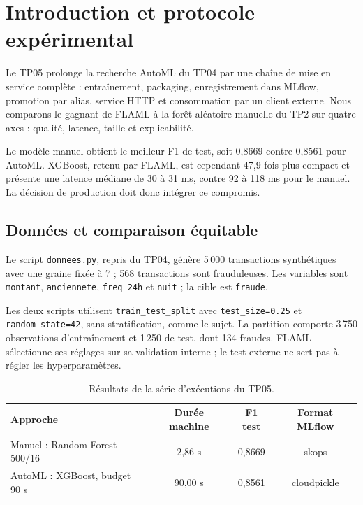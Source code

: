 \documentclass[11pt,a4paper]{article}
\begin{document}
\hypersetup{pageanchor=true}
\newpage
\tableofcontents
\newpage
\section{Introduction et protocole expérimental}
Le TP05 prolonge la recherche AutoML du TP04 par une chaîne de mise en service complète : entraînement, packaging, enregistrement dans MLflow, promotion par alias, service HTTP et consommation par un client externe. Nous comparons le gagnant de FLAML à la forêt aléatoire manuelle du TP2 sur quatre axes : qualité, latence, taille et explicabilité.

Le modèle manuel obtient le meilleur F1 de test, soit 0,8669 contre 0,8561 pour AutoML. XGBoost, retenu par FLAML, est cependant 47,9 fois plus compact et présente une latence médiane de 30 à 31 ms, contre 92 à 118 ms pour le manuel. La décision de production doit donc intégrer ce compromis.

\subsection*{Données et comparaison équitable}
Le script \texttt{donnees.py}, repris du TP04, génère 5\,000 transactions synthétiques avec une graine fixée à 7 ; 568 transactions sont frauduleuses. Les variables sont \texttt{montant}, \texttt{anciennete}, \texttt{freq\_24h} et \texttt{nuit} ; la cible est \texttt{fraude}.

Les deux scripts utilisent \texttt{train\_test\_split} avec \texttt{test\_size=0.25} et \texttt{random\_state=42}, sans stratification, comme le sujet. La partition comporte 3\,750 observations d'entraînement et 1\,250 de test, dont 134 fraudes. FLAML sélectionne ses réglages sur sa validation interne ; le test externe ne sert pas à régler les hyperparamètres.

\begin{table}[H]\centering
\small\renewcommand{\arraystretch}{1.25}
\begin{tabularx}{\linewidth}{X c c c}
\toprule
\textbf{Approche} & \textbf{Durée machine} & \textbf{F1 test} & \textbf{Format MLflow} \\
\midrule
Manuel : Random Forest 500/16 & 2,86 s & 0,8669 & skops \\
AutoML : XGBoost, budget 90 s & 90,00 s & 0,8561 & cloudpickle \\
\bottomrule
\end{tabularx}
\caption{Résultats de la série d'exécutions du TP05.}
\end{table}
\end{document}
